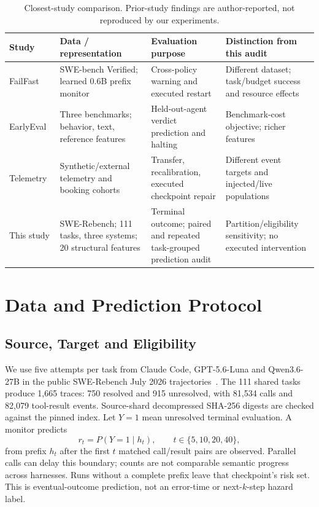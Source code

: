 \documentclass[conference]{IEEEtran}
\begin{document}
\begin{table}[t]
\centering\footnotesize
\caption{Closest-study comparison. Prior-study findings are author-reported, not reproduced by our experiments.}
\label{tab:position}
\begin{tabular}{@{}p{}p{}p{}p{}@{}}
\toprule Study & Data / representation & Evaluation purpose & Distinction from this audit \\
\midrule
FailFast~\cite{failfast} & SWE-bench Verified; learned 0.6B prefix monitor & Cross-policy warning and executed restart & Different dataset; task/budget success and resource effects \\
EarlyEval~\cite{earlyeval} & Three benchmarks; behavior, text, reference features & Held-out-agent verdict prediction and halting & Benchmark-cost objective; richer features \\
Telemetry~\cite{sentinel} & Synthetic/external telemetry and booking cohorts & Transfer, recalibration, executed checkpoint repair & Different event targets and injected/live populations \\
This study & SWE-Rebench; 111 tasks, three systems; 20 structural features & Terminal outcome; paired and repeated task-grouped prediction audit & Partition/eligibility sensitivity; no executed intervention \\
\bottomrule
\end{tabular}
\end{table}

\section{Data and Prediction Protocol}
\subsection{Source, Target and Eligibility}
We use five attempts per task from Claude Code, GPT-5.6-Luna and Qwen3.6-27B in the public SWE-Rebench July 2026 trajectories~\cite{rebench}. The 111 shared tasks produce 1,665 traces: 750 resolved and 915 unresolved, with 81,534 calls and 82,079 tool-result events. Source-shard decompressed SHA-256 digests are checked against the pinned index. Let $Y=1$ mean unresolved terminal evaluation. A monitor predicts
\begin{equation}
 r_t=P(Y=1\mid h_t),\qquad t\in\{5,10,20,40\},
\end{equation}
from prefix $h_t$ after the first $t$ matched call/result pairs are observed. Parallel calls can delay this boundary; counts are not comparable semantic progress across harnesses. Runs without a complete prefix leave that checkpoint's risk set. This is eventual-outcome prediction, not an error-time or next-$k$-step hazard label.
\end{document}
